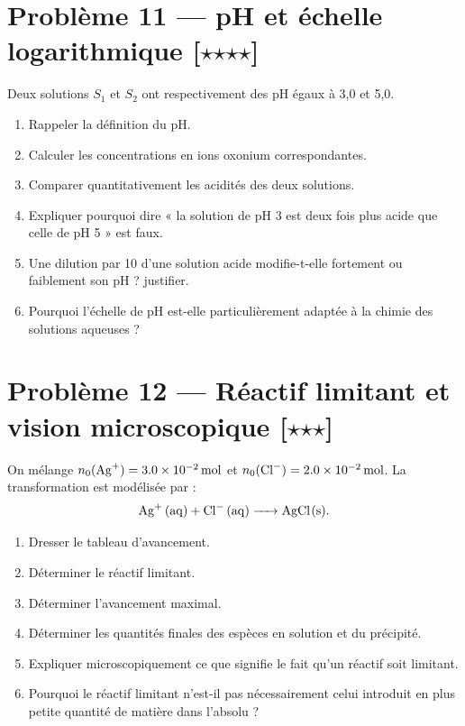 \documentclass[11pt,a4paper]{article}
\newcommand{\etoile}{\ensuremath{\star}}
\begin{document}
\section*{Problème 11 --- pH et échelle logarithmique \hfill [\etoile\etoile\etoile\etoile]}

Deux solutions $S_1$ et $S_2$ ont respectivement des pH égaux à 3,0 et 5,0.

\begin{enumerate}[label=\arabic*)]
    \item Rappeler la définition du pH.
    \item Calculer les concentrations en ions oxonium correspondantes.
    \item Comparer quantitativement les acidités des deux solutions.
    \item Expliquer pourquoi dire « la solution de pH 3 est deux fois plus acide que celle de pH 5 » est faux.
    \item Une dilution par 10 d'une solution acide modifie-t-elle fortement ou faiblement son pH ? justifier.
    \item Pourquoi l'échelle de pH est-elle particulièrement adaptée à la chimie des solutions aqueuses ?
\end{enumerate}

\section*{Problème 12 --- Réactif limitant et vision microscopique \hfill [\etoile\etoile\etoile]}

On mélange $n_0(\ce{Ag^+}) = \SI{3,0e-2}{mol}$ et $n_0(\ce{Cl^-}) = \SI{2,0e-2}{mol}$.
La transformation est modélisée par :
\[
\ce{Ag^+ (aq) + Cl^- (aq) -> AgCl(s)}.
\]

\begin{enumerate}[label=\arabic*)]
    \item Dresser le tableau d'avancement.
    \item Déterminer le réactif limitant.
    \item Déterminer l'avancement maximal.
    \item Déterminer les quantités finales des espèces en solution et du précipité.
    \item Expliquer microscopiquement ce que signifie le fait qu'un réactif soit limitant.
    \item Pourquoi le réactif limitant n'est-il pas nécessairement celui introduit en plus petite quantité de matière dans l'absolu ?
\end{enumerate}
\end{document}
